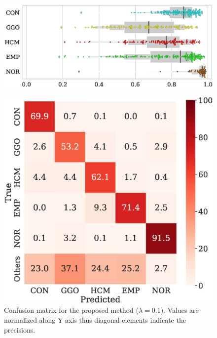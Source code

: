 \begin{figure}[tbp]
\begin{center}
\begin{minipage}[c]{.55\textwidth}
      \includegraphics[width=\linewidth]{swarm_plot/plot.eps}
      \label{dice_swarm}
    \end{minipage}
    \hfill
    \begin{minipage}[c]{.4\textwidth}
      \includegraphics[width=\linewidth]{confusion_matrix/cm.eps}
      \caption{Confusion matrix for the proposed method ($\lambda=0.1$). Values are normalized along Y axis thus diagonal elements indicate the precisions.}
      \label{confusion_matrix}
    \end{minipage}
    \hfill
    \mbox{}
  \end{center}
\end{figure}

